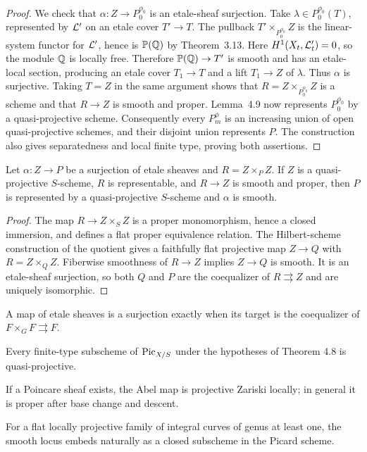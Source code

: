 \begin{proof}
We check that $\alpha:Z\to P_0^{\phi_0}$ is an etale-sheaf surjection. Take
$\lambda\in P_0^{\phi_0}(T)$, represented by $\mathcal L'$ on an etale cover
$T'\to T$. The pullback $T'\times_{P_0^{\phi_0}}Z$ is the linear-system
functor for $\mathcal L'$, hence is $\mathbb P(\mathbb Q)$ by Theorem~3.13. Here
$H^1(X_t,\mathcal L'_t)=0$, so the module $\mathbb Q$ is locally free. Therefore
$\mathbb P(\mathbb Q)\to T'$ is smooth and has an etale-local section, producing an
etale cover $T_1\to T$ and a lift $T_1\to Z$ of $\lambda$. Thus $\alpha$ is
surjective. Taking $T=Z$ in the same argument shows that
$R=Z\times_{P_0^{\phi_0}}Z$ is a scheme and that $R\to Z$ is smooth and
proper. Lemma~4.9 now represents $P_0^{\phi_0}$ by a quasi-projective scheme.
Consequently every $P_m^\phi$ is an increasing union of open quasi-projective
schemes, and their disjoint union represents $P$. The construction also gives
separatedness and local finite type, proving both assertions.
\end{proof}

\begin{lemma}\label{kps-lem-quotient}
Let $\alpha:Z\to P$ be a surjection of etale sheaves and
$R=Z\times_P Z$. If $Z$ is a quasi-projective $S$-scheme, $R$ is representable,
and $R\to Z$ is smooth and proper, then $P$ is represented by a
quasi-projective $S$-scheme and $\alpha$ is smooth.
\end{lemma}
\begin{proof}
The map $R\to Z\times_S Z$ is a proper monomorphism, hence a closed
immersion, and defines a flat proper equivalence relation. The Hilbert-scheme
construction of the quotient gives a faithfully flat projective map $Z\to Q$
with $R=Z\times_QZ$. Fiberwise smoothness of $R\to Z$ implies $Z\to Q$ is
smooth. It is an etale-sheaf surjection, so both $Q$ and $P$ are the
coequalizer of $R\rightrightarrows Z$ and are uniquely isomorphic.
\end{proof}

\begin{remark}\label{kps-ex-quotient-criterion}
A map of etale sheaves is a surjection exactly when its target is the
coequalizer of $F\times_G F\rightrightarrows F$.
\end{remark}
\begin{remark}\label{kps-ex-quasi-projective}
Every finite-type subscheme of $\operatorname{Pic}_{X/S}$ under the hypotheses of Theorem
4.8 is quasi-projective.
\end{remark}
\begin{remark}\label{kps-ex-abel-proper}
If a Poincare sheaf exists, the Abel map is projective Zariski locally; in
general it is proper after base change and descent.
\end{remark}
\begin{remark}\label{kps-ex-curve-abel}
For a flat locally projective family of integral curves of genus at least one,
the smooth locus embeds naturally as a closed subscheme in the Picard scheme.
\end{remark}

